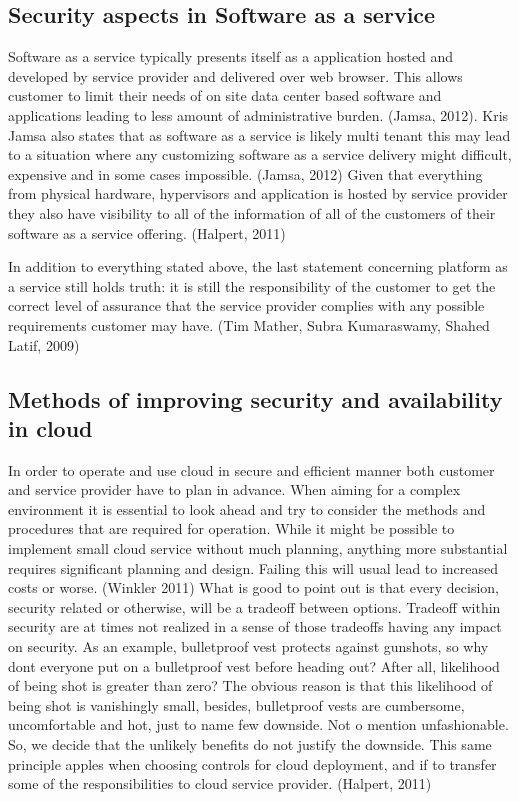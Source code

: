 \documentclass{article}
\begin{document}
\subsection{Security aspects in Software as a service}
Software as a service typically presents itself as a application hosted and developed by service provider and delivered over web browser. This allows customer to limit their needs of on site data center based software and applications leading to less amount of administrative burden. (Jamsa, 2012). Kris Jamsa also states that as software as a service is likely multi tenant this may lead to a situation where any customizing software as a service delivery might difficult, expensive and in some cases impossible. (Jamsa, 2012)
Given that everything from physical hardware, hypervisors and application is hosted by service provider they also have visibility to all of the information of all of the customers of their software as a service offering. (Halpert, 2011)
\par
In addition to everything stated above, the last statement concerning platform as a service still holds truth: it is still the responsibility of the customer to get the correct level of assurance that the service provider complies with any possible requirements customer may have. (Tim Mather, Subra Kumaraswamy, Shahed Latif, 2009)
\subsection{Methods of improving security and availability in cloud}
In order to operate and use cloud in secure and efficient manner both customer and service provider have to plan in advance. When aiming for a complex environment it is essential to look ahead and try to consider the methods and procedures that are required for operation. While it might be possible to implement small cloud service without much planning, anything more substantial requires significant planning and design. Failing this will usual lead to increased costs or worse. (Winkler 2011)
What is good to point out is that every decision, security related or otherwise, will be a tradeoff between options. Tradeoff within security are at times not realized in a sense of those tradeoffs having any impact on security. As an example, bulletproof vest protects against gunshots, so why dont everyone put on a bulletproof vest before heading out? After all, likelihood of being shot is greater than zero? The obvious reason is that this likelihood of being shot is vanishingly small, besides, bulletproof vests are cumbersome, uncomfortable and hot, just to name few downside. Not o mention unfashionable. So, we decide that the unlikely benefits do not justify the downside. This same principle apples when choosing controls for cloud deployment, and if to transfer some of the responsibilities to cloud service provider. (Halpert, 2011)  
\end{document}
